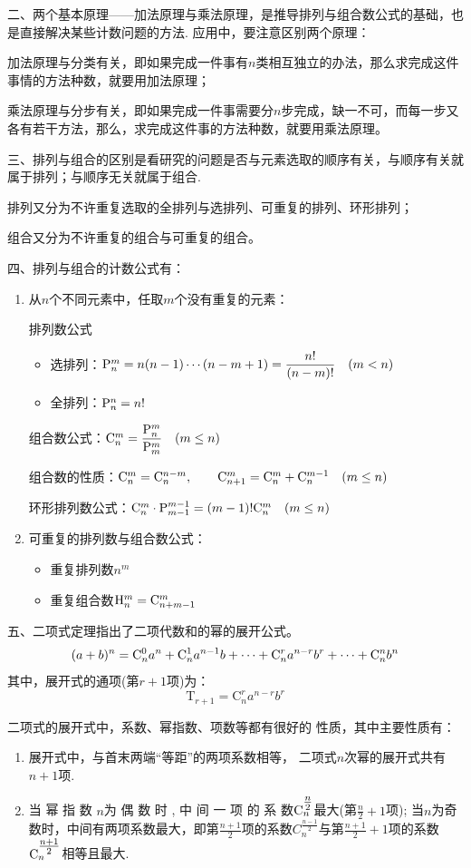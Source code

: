 二、两个基本原理——加法原理与乘法原理，是推导排列与组合数公式的基础，也是直接解决某些计数问题的方法. 应用中，要注意区别两个原理：

加法原理与分类有关，即如果完成一件事有$n$类相互独立的办法，那么求完成这件事情的方法种数，就要用加法原理；

乘法原理与分步有关，即如果完成一件事需要分$n$步完成，缺一不可，而每一步又各有若干方法，那么，求完成这件事的方法种数，就要用乘法原理。

三、排列与组合的区别是看研究的问题是否与元素选取的顺序有关，与顺序有关就属于排列；与顺序无关就属于组合.

排列又分为不许重复选取的全排列与选排列、可重复的排列、环形排列；

组合又分为不许重复的组合与可重复的组合。

四、排列与组合的计数公式有：
\begin{enumerate}
    \item 从$n$个不同元素中，任取$m$个没有重复的元素：

排列数公式
\begin{itemize}
    \item 选排列：${\rm P}^{m}_{n}=n(n-1)\cdots(n-m+1)=\dfrac{n!}{(n-m)!}\quad (m<n)$
    \item 全排列：${\rm P}^{n}_{n}=n!$
\end{itemize}

组合数公式：${\rm C}^{m}_{n}=\dfrac{{\rm P}^{m}_{n}}{{\rm P}^{m}_{m}}\quad (m\le n)$

组合数的性质：${\rm C}^{m}_{n}={\rm C}^{n-m}_{n},\qquad {\rm C}^{m}_{n+1}={\rm C}^{m}_{n}+{\rm C}^{m-1}_{n}\quad (m\le n)$

环形排列数公式：${\rm C}^{m}_{n}\cdot {\rm P}^{m-1}_{m-1}=(m-1)! {\rm C}^{m}_{n}\quad (m\le n)$

\item 可重复的排列数与组合数公式：
\begin{itemize}
    \item 重复排列数$n^m$
    \item 重复组合数${\rm H}^m_n={\rm C}^{m}_{n+m-1}$
\end{itemize}
\end{enumerate}

五、二项式定理指出了二项代数和的幂的展开公式。
\[(a+ b) ^{n}=\mathrm{C}_{n}^{0}a^{n}+{\rm C}_n^{1}a^{n- 1}b+ \cdots + \mathrm{C}_{n}^{r}a^{n- r}b^{r}+ \cdots + \mathrm{C} _{n}^{n}b^{n}\]
其中，展开式的通项(第$r+1$项)为：
$$\mathrm{T}_{r+1}=\mathrm{C}_{n}^{r}a^{n-r}b^{r}$$

二项式的展开式中，系数、幂指数、项数等都有很好的
性质，其中主要性质有：
\begin{enumerate}
    \item 
展开式中，与首末两端“等距”的两项系数相等，
二项式$n$次幂的展开式共有$n+1$项.
\item 
当 幂 指 数 $n$为 偶 数 时 , 中 间 一 项 的 系 数${\rm C}_n^{\tfrac{n}{2}}$最大(第$\frac n2+1$项); 当$n$为奇数时，中间有两项系数最大，即第$\frac{n+1}2$项的系数$C_{n}^{\tfrac{n-1}2}$与第$\frac{n+1}2+1$项的系数${\rm C}_{n}^{\tfrac{n+1}2}$相等且最大.
\end{enumerate}

